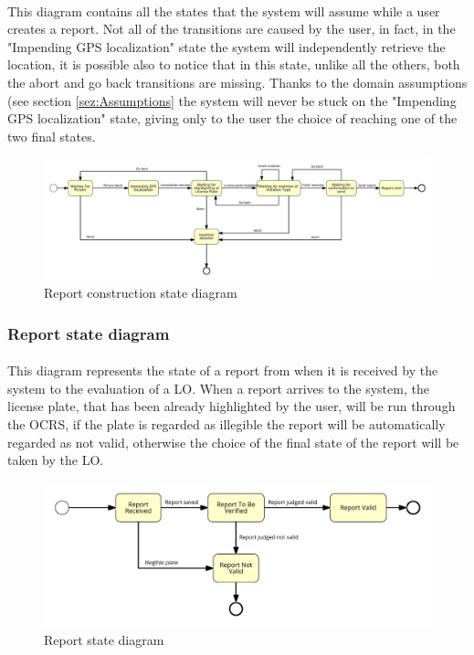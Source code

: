 					\paragraph{}
						This diagram contains all the states that the system will assume while a user creates a report.
						Not all of the
transitions are caused by the user, in fact, in the "Impending GPS localization" state the system will independently retrieve the location, it is possible also to notice that in this state, unlike all the others, both the abort and go back transitions are missing.
						Thanks to the domain assumptions (see section \ref{sez:Assumptions} the system will never be stuck on the "Impending GPS localization" state, giving only to the user the choice of reaching one of the two final states.
						\begin{figure}[htbp]
  							\includegraphics[width=\textwidth]{images/StateDiagram/ReportCreationToolStateDiagram.pdf}
  							\centering
  							\caption{Report construction state diagram}
						\end{figure}
				\subsubsection{Report state diagram}
					\paragraph{}
						This diagram represents the state of a report from when it is received by the system to the evaluation of a LO. When a report arrives to the system, the license plate, that has been already highlighted by the user, will be run through the OCRS, if the plate is regarded as illegible the report will be automatically regarded as not valid, otherwise the choice of the final state of the report will be taken by the LO.
					\begin{figure}[htbp]
  							\includegraphics[width=\textwidth]{images/StateDiagram/ReportStateDiagram.pdf}
  							\centering
  							\caption{Report state diagram}
						\end{figure}
